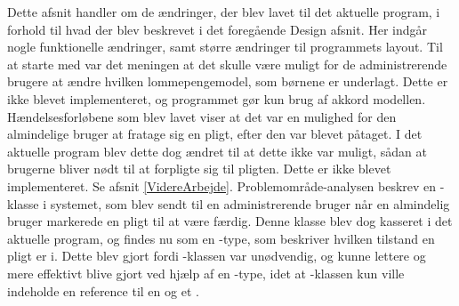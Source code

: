 Dette afsnit handler om de ændringer, der blev lavet til det aktuelle program, i forhold til hvad der blev beskrevet i det foregående Design afsnit. Her indgår nogle funktionelle ændringer, samt større ændringer til programmets layout.
Til at starte med var det meningen at det skulle være muligt for de administrerende brugere at ændre hvilken lommepengemodel, som børnene er underlagt. Dette er ikke blevet implementeret, og programmet gør kun brug af akkord modellen. Hændelsesforløbene som blev lavet viser at det var en mulighed for den almindelige bruger at fratage sig en pligt, efter den var blevet påtaget. I det aktuelle program blev dette dog ændret til at dette ikke var muligt, sådan at brugerne bliver nødt til at forpligte sig til pligten. Dette er ikke blevet implementeret. Se afsnit \ref{VidereArbejde}.
Problemområde-analysen beskrev en -klasse i systemet, som blev sendt til en administrerende bruger når en almindelig bruger markerede en pligt til at være færdig. Denne klasse blev dog kasseret i det aktuelle program, og findes nu som en -type, som beskriver hvilken tilstand en pligt er i. Dette blev gjort fordi -klassen var unødvendig, og kunne lettere og mere effektivt blive gjort ved hjælp af en -type, idet at -klassen kun ville indeholde en reference til en  og et .